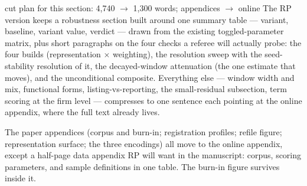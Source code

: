 \begin{ericbox}{cut plan for this section: 4,740 $\to$ 1,300 words; appendices $\to$ online}
The RP version keeps a robustness section built around one summary table
--- variant, baseline, variant value, verdict --- drawn from the existing
toggled-parameter matrix, plus short paragraphs on the four checks a
referee will actually probe: the four builds (representation
$\times$ weighting), the resolution sweep with the seed-stability
resolution of it, the decayed-window attenuation (the one estimate that
moves), and the unconditional composite. Everything else --- window
width and mix, functional forms, listing-vs-reporting, the small-residual
subsection, term scoring at the firm level --- compresses to one
sentence each pointing at the online appendix, where the full text
already lives.

The paper appendices (corpus and burn-in; registration profiles; refile
figure; representation surface; the three encodings) all move to the
online appendix, except a half-page data appendix RP will want in the
manuscript: corpus, scoring parameters, and sample definitions in one
table. The burn-in figure survives inside it.
\end{ericbox}
